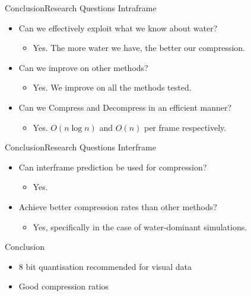 \documentclass{beamer}
\begin{document}
\begin{frame}{Conclusion}{Research Questions}
  Intraframe
  \begin{itemize}
  \item Can we effectively exploit what we know about water?
    \begin{itemize}
    \item Yes. The more water we have, the better our compression.
    \end{itemize}
  \item Can we improve on other methods?
    \begin{itemize}
    \item Yes. We improve on all the methods tested.
    \end{itemize}
  \item Can we Compress and Decompress in an efficient manner?
    \begin{itemize}
    \item Yes. $O(n \log n)$ and $O(n)$ per frame respectively.
    \end{itemize}
  \end{itemize}
\end{frame}

\begin{frame}{Conclusion}{Research Questions}
Interframe
\begin{itemize}
 \item Can interframe prediction be used for compression?
 \begin{itemize}
  \item Yes.
 \end{itemize}
 \item Achieve better compression rates than other methods?
 \begin{itemize}
  \item Yes, specifically in the case of water-dominant simulations.
 \end{itemize}
\end{itemize}
\end{frame}

\begin{frame}{Conclusion}
\begin{itemize}
 \item 8 bit quantisation recommended for visual data
 \item Good compression ratios
\end{itemize}
\end{frame}
\end{document}
